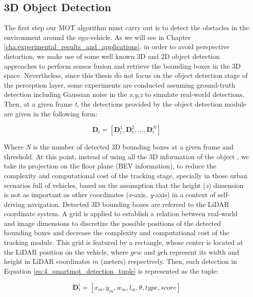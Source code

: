 \subsection{3D Object Detection}

The first step our \ac{MOT} algorithm must carry out is to detect the obstacles in the environment around the ego-vehicle. As we will see in Chapter \ref{cha:experimental_results_and_applications}, in order to avoid perspective distortion, we make use of some well known 3D and 2D object detection approaches \cite{lang2019pointpillars, redmon2016you} to perform sensor fusion and retrieve the bounding boxes in the 3D space. Nevertheless, since this thesis do not focus on the object detection stage of the perception layer, some experiments are conducted assuming ground-truth detection including Gaussian noise in the \textit{x,y,z} to simulate real-world detections. Then, at a given frame \textit{t}, the detections provided by the object detection module are given in the following form:

\begin{equation}
	\label{eq:4_smartmot_detection}
	\textbf{D}_{t} =[\textbf{D}_{t}^{1},\textbf{D}_{t}^{2}, ...,\textbf{D}_{t}^{N}]
\end{equation}

Where \textit{N} is the number of detected 3D bounding boxes at a given frame and threshold. At this point, instead of using all the 3D information of the object \cite{chiu2021probabilistic, weng20203d}, we take its projection on the floor plane (\ac{BEV} information), to reduce the complexity and computational cost of the tracking stage, specially in those urban scenarios full of vehicles, based on the assumption that the height (\textit{z}) dimension is not as important as other coordinates (\textit{x}-axis, \textit{y}-axis) in a context of self-driving navigation. Detected 3D bounding boxes are referred to the LiDAR coordinate system. A grid is applied to establish a relation between real-world and image dimensions to discretize the possible positions of the detected bounding boxes and decrease the complexity and computational cost of the tracking module. This grid is featured by a rectangle, whose center is located at the LiDAR position on the vehicle, where $\textit{grw}$ and $\textit{grh}$ represent its width and height in LiDAR coordinates $\textit{m}$ (meters) respectively. Then, each detection in Equation \ref{eq:4_smartmot_detection_tuple} is represented as the tuple:

\begin{equation}
	\label{eq:4_smartmot_detection_tuple}
	\textbf{D}_{t}^{i} = [x_{m},y_{m},w_{m},l_{m},\theta,type,score]
\end{equation}

